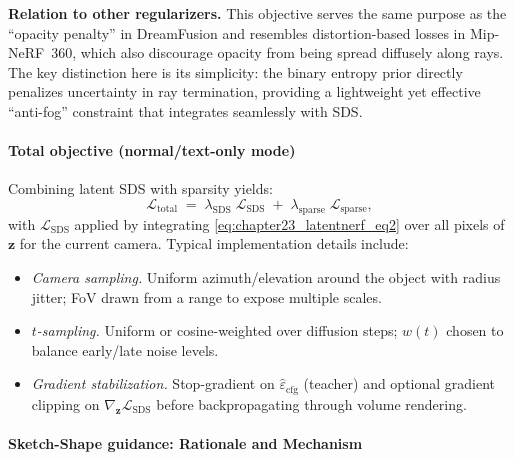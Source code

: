 \begin{enrichment}
\begin{enrichment}
        \textbf{Relation to other regularizers.}
        This objective serves the same purpose as the ``opacity penalty'' in DreamFusion and resembles distortion-based losses in Mip-NeRF~360, which also discourage opacity from being spread diffusely along rays. The key distinction here is its simplicity: the binary entropy prior directly penalizes uncertainty in ray termination, providing a lightweight yet effective ``anti-fog'' constraint that integrates seamlessly with SDS.
        
        \paragraph{Total objective (normal/text-only mode)}
        Combining latent SDS with sparsity yields:
        \begin{equation}
            \mathcal{L}_{\text{total}}
            \;=\;
            \lambda_{\mathrm{SDS}}\;\mathcal{L}_{\mathrm{SDS}}
            \;+\;
            \lambda_{\mathrm{sparse}}\;\mathcal{L}_{\mathrm{sparse}},
            \label{eq:chapter23_latentnerf_total_objective}
        \end{equation}
        with $\mathcal{L}_{\mathrm{SDS}}$ applied by integrating \eqref{eq:chapter23_latentnerf_eq2} over all pixels of $\mathbf{z}$ for the current camera. Typical implementation details include:
        \begin{itemize}
            \item \emph{Camera sampling.} Uniform azimuth/elevation around the object with radius jitter; FoV drawn from a range to expose multiple scales.
            \item \emph{$t$-sampling.} Uniform or cosine-weighted over diffusion steps; $w(t)$ chosen to balance early/late noise levels.
            \item \emph{Gradient stabilization.} Stop-gradient on $\hat\varepsilon_{\mathrm{cfg}}$ (teacher) and optional gradient clipping on $\nabla_{\mathbf{z}}\mathcal{L}_{\mathrm{SDS}}$ before backpropagating through volume rendering.
        \end{itemize}
        
        \newpage
        
        \paragraph{Sketch-Shape guidance: Rationale and Mechanism}
        

\end{enrichment}
\end{enrichment}
